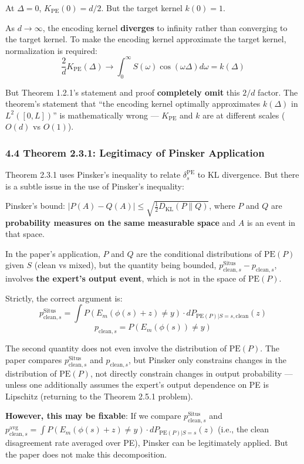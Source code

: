 \documentclass[
  12pt,
]{article}
\begin{document}
At $\Delta = 0$, $K_{\text{PE}}(0) = d/2$. But the target kernel $k(0) = 1$.

As $d \to \infty$, the encoding kernel \textbf{diverges} to infinity rather than converging to the target kernel. To make the encoding kernel approximate the target kernel, normalization is required:
\[\frac{2}{d} K_{\text{PE}}(\Delta) \to \int_0^\infty S(\omega)\cos(\omega\Delta)d\omega = k(\Delta)\]

But Theorem 1.2.1's statement and proof \textbf{completely omit} this $2/d$ factor. The theorem's statement that ``the encoding kernel optimally approximates $k(\Delta)$ in $L^2([0,L])$'' is mathematically wrong --- $K_{\text{PE}}$ and $k$ are at different scales ($O(d)$ vs $O(1)$).

\subsubsection{4.4 Theorem 2.3.1: Legitimacy of Pinsker Application}\label{pinsker-legitimacy}

Theorem 2.3.1 uses Pinsker's inequality to relate $\delta_s^{\text{PE}}$ to KL divergence. But there is a subtle issue in the use of Pinsker's inequality:

Pinsker's bound: $|P(A) - Q(A)| \leq \sqrt{\frac{1}{2}D_{\text{KL}}(P\|Q)}$, where $P$ and $Q$ are \textbf{probability measures on the same measurable space} and $A$ is an event in that space.

In the paper's application, $P$ and $Q$ are the conditional distributions of $\text{PE}(P)$ given $S$ (clean vs mixed), but the quantity being bounded, $p_{\text{clean},s}^{\text{Situs}} - p_{\text{clean},s}$, involves \textbf{the expert's output event}, which is not in the space of $\text{PE}(P)$.

Strictly, the correct argument is:
\[p_{\text{clean},s}^{\text{Situs}} = \int P(E_m(\phi(s)+z) \neq y) \cdot dP_{\text{PE}(P)|S=s,\text{clean}}(z)\]
\[p_{\text{clean},s} = P(E_m(\phi(s)) \neq y)\]

The second quantity does not even involve the distribution of $\text{PE}(P)$. The paper compares $p_{\text{clean},s}^{\text{Situs}}$ and $p_{\text{clean},s}$, but Pinsker only constrains changes in the distribution of $\text{PE}(P)$, not directly constrain changes in output probability --- unless one additionally assumes the expert's output dependence on PE is Lipschitz (returning to the Theorem 2.5.1 problem).

\textbf{However, this may be fixable}: If we compare $p_{\text{clean},s}^{\text{Situs}}$ and $p_{\text{clean},s}^{\text{avg}} = \int P(E_m(\phi(s)+z) \neq y) \cdot dP_{\text{PE}(P)|S=s}(z)$ (i.e., the clean disagreement rate averaged over PE), Pinsker can be legitimately applied. But the paper does not make this decomposition.
\end{document}
